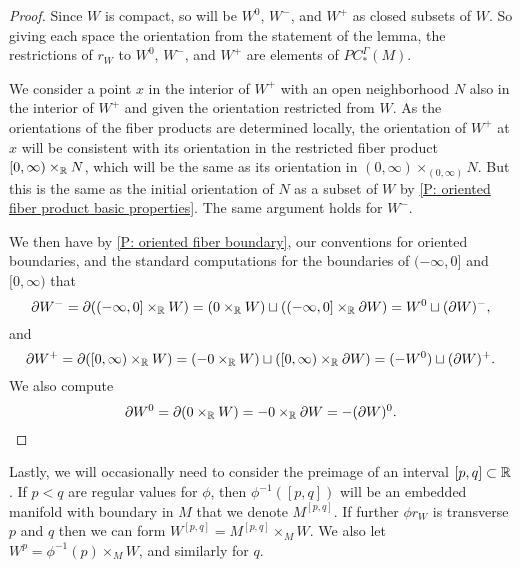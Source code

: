 \begin{proof}
	Since $W$ is compact, so will be $W^0$, $W^-$, and $W^+$ as closed subsets of $W$.
	So giving each space the orientation from the statement of the lemma, the restrictions of $r_W$ to $W^0$, $W^-$, and $W^+$ are elements of $PC_*^\Gamma(M)$.

	We consider a point $x$ in the interior of $W^+$ with an open neighborhood $N$ also in the interior of $W^+$ and given the orientation restricted from $W$.
	As the orientations of the fiber products are determined locally, the orientation of $W^+$ at $x$ will be consistent with its orientation in the restricted fiber product $[0,\infty) \times_{\mathbb{R}} N$, which will be the same as its orientation in $(0,\infty) \times_{(0,\infty)} N$.
	But this is the same as the initial orientation of $N$ as a subset of $W$ by \cref{P: oriented fiber product basic properties}.
	The same argument holds for $W^-$.

	We then have by \cref{P: oriented fiber boundary}, our conventions for oriented boundaries, and the standard computations for the boundaries of $(-\infty,0]$ and $[0,\infty)$ that
	\begin{equation*}
			\partial W^- = \partial ((-\infty,0] \times_{\mathbb{R}} W) = (0 \times_{\mathbb{R}} W)  \sqcup ((-\infty,0] \times_{\mathbb{R}} \partial 	W) = W^0 \sqcup (\partial W)^-,
	\end{equation*}
	and
	\begin{equation*}
			\partial W^+ = \partial ([0,\infty) \times_{\mathbb{R}} W) = (-0 \times_{\mathbb{R}} W)  \sqcup ([0,\infty) \times_{\mathbb{R}} \partial W) 	= (-W^0) \sqcup (\partial W)^+.
	\end{equation*}
	We also compute
	\begin{equation*}
			\partial W^0 = \partial (0 \times_{\mathbb{R}} W) = - 0 \times_{\mathbb{R}} \partial W = -(\partial W)^0. \qedhere
\end{equation*}
\end{proof}

Lastly, we will occasionally need to consider the preimage of an interval $[p,q] \subset \mathbb{R}$.
If $p < q$ are regular values for $\phi$, then $\phi^{-1}([p,q])$ will be an embedded manifold with boundary in $M$ that we denote $M^{[p,q]}$.
If further $\phi r_W$ is transverse $p$ and $q$ then we can form $W^{[p,q]} = M^{[p,q]} \times_M W$.
We also let $W^p = \phi^{-1}(p) \times_M W$, and similarly for $q$.

